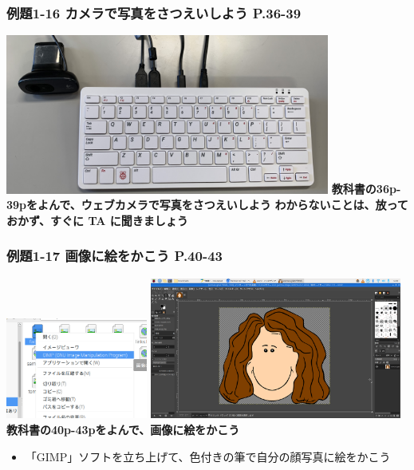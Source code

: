 \documentclass[dvipdfmx]{beamer}
\begin{document}
\begin{frame}[fragile]
	\frametitle{例題1-16 カメラで写真をさつえいしよう P.36-39~~~}
    \includegraphics[width=0.8\textwidth]{slide03_003.jpg}
    \vfill
    \large\textbf{教科書の36p-39pをよんで、ウェブカメラで写真をさつえいしよう}
    \vfill
    \large\textbf{わからないことは、放っておかず、すぐに TA に聞きましょう}
\end{frame}


\begin{frame}[fragile]
	\frametitle{例題1-17 画像に絵をかこう P.40-43~~~}
  \includegraphics[width=0.35\textwidth]{textbook-img124.png}
  \hfill
  \includegraphics[width=0.62\textwidth]{textbook-img125.png}
  \vfill
  \large\textbf{教科書の40p-43pをよんで、画像に絵をかこう}
  \begin{itemize}
    \item 「GIMP」ソフトを立ち上げて、色付きの筆で自分の顔写真に絵をかこう
  \end{itemize}

\end{frame}
\end{document}
